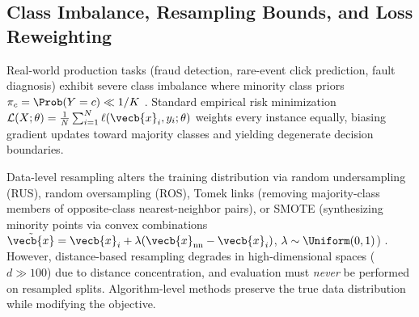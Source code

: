 \documentclass[../../../../master.tex]{subfiles}
\begin{document}
\subsection{Class Imbalance, Resampling Bounds, and Loss Reweighting}

Real-world production tasks (fraud detection, rare-event click prediction, fault diagnosis) exhibit severe class imbalance where minority class priors $\pi_c = \Prob(Y = c) \ll 1/K$ . Standard empirical risk minimization $\mathcal{L}(X; \theta) = \frac{1}{N} \sum_{i=1}^N \ell(\vecb{x}_i, y_i; \theta)$ weights every instance equally, biasing gradient updates toward majority classes and yielding degenerate decision boundaries.

Data-level resampling alters the training distribution via random undersampling (RUS), random oversampling (ROS), Tomek links (removing majority-class members of opposite-class nearest-neighbor pairs), or SMOTE (synthesizing minority points via convex combinations $\tilde{\vecb{x}} = \vecb{x}_i + \lambda(\vecb{x}_{\mathrm{nn}} - \vecb{x}_i)$, $\lambda \sim \Uniform(0,1)$) . However, distance-based resampling degrades in high-dimensional spaces ($d \gg 100$) due to distance concentration, and evaluation must \emph{never} be performed on resampled splits. Algorithm-level methods preserve the true data distribution while modifying the objective.
\end{document}
